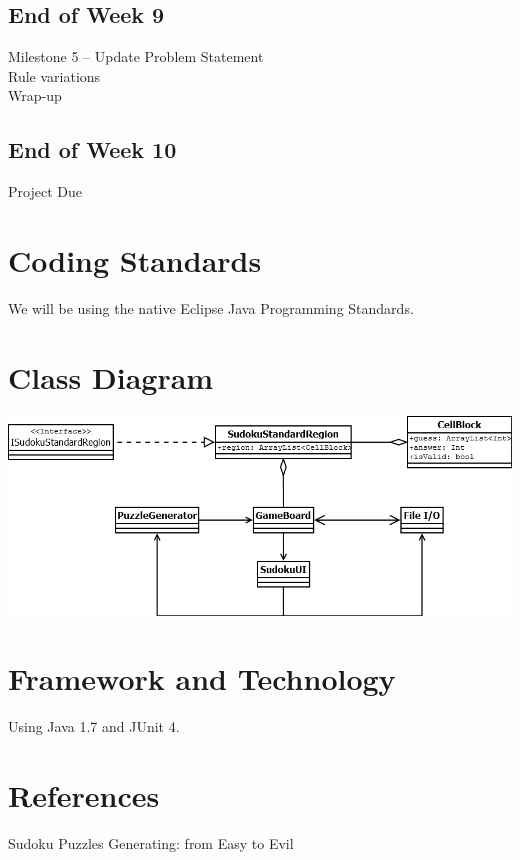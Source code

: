 \documentclass{article}
\begin{document}
\subsection{End of Week 9}
Milestone 5 – Update Problem Statement\\
Rule variations\\
Wrap-up\\

\subsection{End of Week 10}
Project Due


\section{Coding Standards}
We will be using the native Eclipse Java Programming Standards. 


\section{Class Diagram}

\begin{center}
\includegraphics[scale=0.5]{ClassDiagram.png}
\end{center}

\section{Framework and Technology}
Using Java 1.7 and JUnit 4.

\section{References}
Sudoku Puzzles Generating: from Easy to Evil
\end{document}
